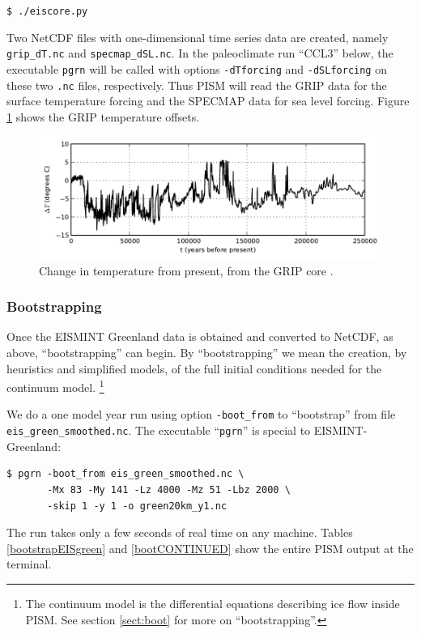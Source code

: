 \documentclass[11pt,final]{amsart}
\begin{document}
\verb|$ ./eiscore.py|

\noindent Two NetCDF files with one-dimensional time series data are created, namely \verb|grip_dT.nc| and \verb|specmap_dSL.nc|.  In the paleoclimate run ``CCL3'' below, the executable \verb|pgrn| will be called with options \verb|-dTforcing| and \verb|-dSLforcing| on these two \verb|.nc| files, respectively.  Thus PISM will read the GRIP data \cite{Dansgaardetal1993} for the surface temperature forcing and the SPECMAP data \cite{Imbrieetal1984} for sea level forcing.  Figure \ref{fig:gripDeltaT} shows the GRIP temperature offsets.

\begin{figure}[ht]
\includegraphics[width=5.6in,keepaspectratio=true]{gripDeltaT}
\caption{Change in temperature from present, from the GRIP core \cite{JohnsenetalGRIP}.}
\label{fig:gripDeltaT}
\end{figure}


\subsubsection*{Bootstrapping}  \label{sect:green-bootstrapping}  Once the EISMINT Greenland data is obtained and converted to NetCDF, as above, ``bootstrapping'' can begin.  By ``bootstrapping'' we mean the creation, by heuristics and simplified models, of the full initial conditions needed for the continuum model.  \footnote{The continuum model is the differential equations describing ice flow inside PISM.  See section \ref{sect:boot} for more on ``bootstrapping''.}

We do a one model year run using option \verb|-boot_from| to ``bootstrap'' from file \verb|eis_green_smoothed.nc|.  The executable ``\verb|pgrn|'' is special to EISMINT-Greenland:
\begin{verbatim}
$ pgrn -boot_from eis_green_smoothed.nc \
       -Mx 83 -My 141 -Lz 4000 -Mz 51 -Lbz 2000 \
       -skip 1 -y 1 -o green20km_y1.nc
\end{verbatim}
\noindent The run takes only a few seconds of real time on any machine.  Tables \ref{bootstrapEISgreen} and \ref{bootCONTINUED} show the entire PISM output at the terminal.
\end{document}
